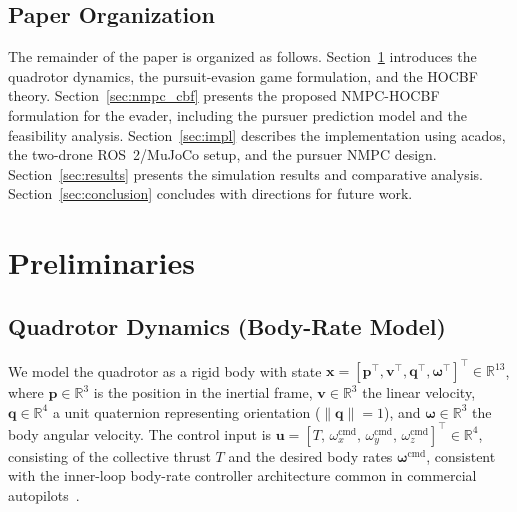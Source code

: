 \documentclass[lettersize,journal]{IEEEtran}
\theoremstyle{definition}
\theoremstyle{remark}
\newcommand{\R}{\mathbb{R}}
\newcommand{\vect}[1]{\bm{#1}}
\begin{document}
\subsection{Paper Organization}

The remainder of the paper is organized as follows.
Section~\ref{sec:prelim} introduces the quadrotor dynamics, the
pursuit-evasion game formulation, and the HOCBF theory.
Section~\ref{sec:nmpc_cbf} presents the proposed NMPC-HOCBF
formulation for the evader, including the pursuer prediction model
and the feasibility analysis.
Section~\ref{sec:impl} describes the implementation using acados,
the two-drone ROS~2/MuJoCo setup, and the pursuer NMPC design.
Section~\ref{sec:results} presents the simulation results and
comparative analysis.
Section~\ref{sec:conclusion} concludes with directions for future work.

\section{Preliminaries}
\label{sec:prelim}

\subsection{Quadrotor Dynamics (Body-Rate Model)}
\label{sec:dynamics}

We model the quadrotor as a rigid body with state
$\vect{x} = [\vect{p}^\top, \vect{v}^\top, \vect{q}^\top,
              \vect{\omega}^\top]^\top \in \R^{13}$,
where $\vect{p} \in \R^3$ is the position in the inertial frame,
$\vect{v} \in \R^3$ the linear velocity, $\vect{q} \in \R^4$ a
unit quaternion representing orientation ($\|\vect{q}\|=1$),
and $\vect{\omega} \in \R^3$ the body angular velocity.
The control input is
$\vect{u} = [T,\, \omega_{x}^{\mathrm{cmd}},\,
              \omega_{y}^{\mathrm{cmd}},\,
              \omega_{z}^{\mathrm{cmd}}]^\top \in \R^4$,
consisting of the collective thrust $T$ and the desired body rates
$\vect{\omega}^{\mathrm{cmd}}$, consistent with the inner-loop
body-rate controller architecture common in commercial
autopilots~\cite{kaufmann2025learned, zhang2024online}.
\end{document}
